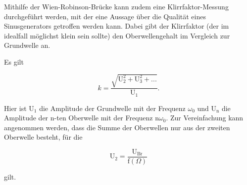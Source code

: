 \noindent
Mithilfe der Wien-Robinson-Brücke kann zudem eine Klirrfaktor-Messung durchgeführt werden, mit der eine Aussage über die Qualität eines Sinusgenerators getroffen werden kann.
Dabei gibt der Klirrfaktor (der im idealfall möglichst klein sein sollte) den Oberwellengehalt im Vergleich zur Grundwelle an.

\noindent
Es gilt

\begin{equation}
k = \frac{\sqrt{\text{U}_2^2 + \text{U}_3^2 + ...}}{\text{U}_1}  .
\label{eqn:klirr}
\end{equation}

\noindent
Hier ist $\text{U}_1$ die Amplitude der Grundwelle mit der Frequenz $\omega_0$ und $\text{U}_\text{n}$ die Amplitude der n-ten Oberwelle mit der Frequenz $\text{n} \omega_0$.
Zur Vereinfachung kann angenommen werden, dass die Summe der Oberwellen nur aus der zweiten Oberwelle besteht, für die 

\begin{equation}
\text{U}_2 = \frac{\text{U}_\text{Br}}{\text{f}(\Omega)}
\label{eqn:2oberwelle}
\end{equation}

\noindent
gilt.